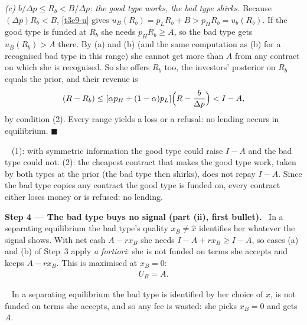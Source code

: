 \documentclass[11pt,a4paper]{article}
\newcommand{\step}[2]{\par\medskip\noindent\textbf{Step #1 --- #2.}~}
\newcommand{\answer}[1]{\par\smallskip\noindent\fbox{\textbf{Answer #1.}}~}
\begin{document}
\emph{(c) $b/\Delta p\le R_b<B/\Delta p$: the good type works, the bad type shirks.} Because
$(\Delta p)R_b<B$, \eqref{t3e9-u} gives $u_B(R_b)=p_LR_b+B>p_HR_b=u_b(R_b)$. If the good type is funded at
$R_b$ she needs $p_HR_b\ge A$, so the bad type gets $u_B(R_b)>A$ there. By (a) and (b) (and the same
computation as (b) for a recognised bad type in this range) she cannot get more than $A$ from any contract
on which she is recognised. So she offers $R_b$ too, the investors' posterior on $R_b$ equals the prior,
and their revenue is
\begin{align}
  [\alpha p_H+(1-\alpha)p_L](R-R_b)
  \le [\alpha p_H+(1-\alpha)p_L]\Bigl(R-\frac{b}{\Delta p}\Bigr) < I-A, \nonumber
\end{align}
by condition (2). Every range yields a loss or a refusal: no lending occurs in equilibrium.
$\blacksquare$

\answer{(i)} (1): with symmetric information the good type could raise $I-A$ and the bad type could not. (2): the cheapest contract that makes the good type work, taken by both types at the prior (the bad type then shirks), does not repay $I-A$. Since the bad type copies any contract the good type is funded on, every contract either loses money or is refused: no lending.

\step{4}{The bad type buys no signal (part (ii), first bullet)} In a separating equilibrium the bad type's
quality $x_B\ne\hat x$ identifies her whatever the signal shows. With net cash $A-rx_B$ she needs
$I-A+rx_B\ge I-A$, so cases (a) and (b) of Step~3 apply \emph{a fortiori}: she is not funded on terms she
accepts and keeps $A-rx_B$. This is maximised at $x_B=0$:
\begin{align}
  U_B = A. \label{t3e9-UB}
\end{align}

\answer{(ii-1)} In a separating equilibrium the bad type is identified by her choice of $x$, is not funded on terms she accepts, and so any fee is wasted: she picks $x_B=0$ and gets $A$.
\end{document}
